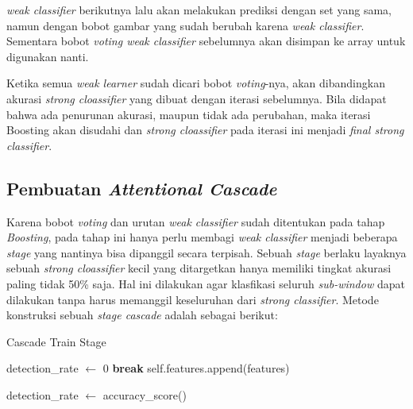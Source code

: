 \textit{weak classifier} berikutnya lalu akan melakukan prediksi dengan set yang sama, 
namun dengan bobot gambar yang sudah berubah karena \textit{weak classifier}. Sementara 
bobot \textit{voting weak classifier} sebelumnya akan disimpan ke array untuk digunakan nanti. 

Ketika semua \textit{weak learner} sudah dicari bobot \textit{voting}-nya, akan dibandingkan 
akurasi \textit{strong cloassifier} yang dibuat dengan iterasi sebelumnya. Bila didapat bahwa 
ada penurunan akurasi, maupun tidak ada perubahan, maka iterasi Boosting akan disudahi dan 
\textit{strong cloassifier} pada iterasi ini menjadi \textit{final strong classifier}.

\subsection{Pembuatan \emph{Attentional Cascade}}

Karena bobot \textit{voting} dan urutan \textit{weak classifier} sudah ditentukan pada 
tahap \textit{Boosting}, pada tahap ini hanya perlu membagi \textit{weak classifier} menjadi 
beberapa \textit{stage} yang nantinya bisa dipanggil secara terpisah. Sebuah \textit{stage} 
berlaku layaknya sebuah \textit{strong cloassifier} kecil yang ditargetkan hanya memiliki 
tingkat akurasi paling tidak 50\% saja. Hal ini dilakukan agar klasfikasi seluruh \textit{sub-window} 
dapat dilakukan tanpa harus memanggil keseluruhan dari \textit{strong classifier}. 
Metode konstruksi sebuah \textit{stage cascade} adalah sebagai berikut:

\begin{algorithm}
  \caption{Cascade Train Stage}
  \begin{algorithmic}[1]
      \State detection\_rate $\gets$ 0
          \State \textbf{break}
        \EndIf
        \State self.features.append(features)

        \State detection\_rate $\gets$ accuracy\_score()
      \EndWhile
    \EndFunction
  \end{algorithmic}
\end{algorithm}

